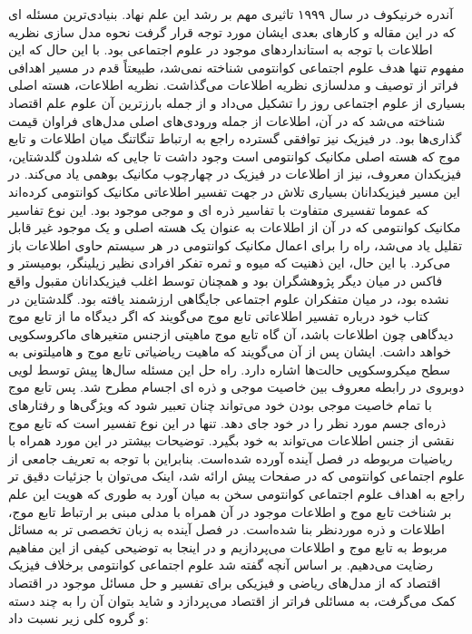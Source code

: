 \documentclass[a4paper,titlepage,12pt,fleqn,oneside]{report}
\begin{document}
	آندره خرنیکوف  در سال ۱۹۹۹ تاثیری مهم بر رشد این علم نهاد. بنیادی‌ترین مسئله ای که در این مقاله و کارهای بعدی ایشان\cite{kh3} مورد توجه قرار گرفت نحوه مدل سازی نظریه اطلاعات با توجه به استانداردهای موجود در علوم اجتماعی بود. با این حال که این مفهوم تنها هدف علوم اجتماعی کوانتومی شناخته نمی‌شد، طبیعتاً قدم در مسیر اهدافی فراتر از توصیف و مدلسازی نظریه اطلاعات می‌گذاشت. نظریه اطلاعات، هسته اصلی بسیاری از علوم اجتماعی روز را تشکیل می‌داد و از جمله بارزترین آن علوم علم اقتصاد شناخته می‌شد که در آن، اطلاعات از جمله ورودی‌های اصلی مدل‌های فراوان قیمت گذاری‌ها بود. در فیزیک نیز توافقی گسترده راجع به ارتباط تنگاتنگ میان اطلاعات و تابع موج که هسته اصلی مکانیک کوانتومی است وجود داشت تا جایی که شلدون گلدشتاین، فیزیکدان معروف، نیز  از اطلاعات در فیزیک در چهارچوب مکانیک بوهمی یاد می‌کند\cite{gold}.  در این مسیر فیزیکدانان بسیاری تلاش در جهت تفسیر اطلاعاتی مکانیک کوانتومی کرده‌اند که عموما تفسیری متفاوت با تفاسیر ذره ای و موجی موجود بود. این نوع تفاسیر مکانیک کوانتومی که در آن از اطلاعات به عنوان یک هسته اصلی و یک موجود غیر قابل تقلیل یاد می‌شد، راه را برای اعمال مکانیک کوانتومی در هر سیستم حاوی اطلاعات باز می‌کرد. با این حال، این ذهنیت که میوه و ثمره تفکر افرادی نظیر زیلینگر، بومیستر\cite{boosem} و فاکس\cite{fucks}  در میان دیگر پژوهشگران بود و همچنان توسط اغلب فیزیکدانان مقبول واقع نشده بود، در میان متفکران علوم اجتماعی جایگاهی ارزشمند یافته بود. گلدشتاین در کتاب خود درباره تفسیر اطلاعاتی تابع موج می‌گویند که اگر دیدگاه ما از تابع موج دیدگاهی چون اطلاعات باشد، آن گاه تابع موج ماهیتی ازجنس متغیرهای ماکروسکوپی خواهد داشت. ایشان پس از آن می‌گویند که ماهیت ریاضیاتی تابع موج و هامیلتونی به سطح میکروسکوپی حالت‌ها اشاره دارد. راه حل این مسئله سال‌ها پیش توسط لویی دوبروی در رابطه معروف بین خاصیت موجی و ذره ای اجسام مطرح شد. پس تابع موج با تمام خاصیت موجی بودن خود می‌تواند چنان تعبیر شود که ویژگی‌ها و رفتارهای ذره‌ای جسم مورد نظر را در خود جای دهد. تنها در این نوع تفسیر است که تابع موج نقشی از جنس اطلاعات می‌تواند به خود بگیرد. توضیحات بیشتر در این مورد همراه با ریاضیات مربوطه در فصل آینده آورده شده‌است. بنابراین با توجه به تعریف جامعی از علوم اجتماعی کوانتومی که در صفحات پیش ارائه شد، اینک می‌توان با جزئیات دقیق تر راجع به اهداف علوم اجتماعی کوانتومی سخن به میان آورد به طوری که هویت این علم بر شناخت تابع موج و اطلاعات موجود در آن همراه با مدلی مبنی بر ارتباط تابع موج، اطلاعات و ذره موردنظر بنا شده‌است. در فصل آینده به زبان تخصصی تر به مسائل مربوط به تابع موج و اطلاعات می‌پردازیم و در اینجا به توضیحی کیفی از این مفاهیم رضایت می‌دهیم. بر اساس آنچه گفته شد علوم اجتماعی کوانتومی برخلاف فیزیک اقتصاد که از مدل‌های ریاضی و فیزیکی برای تفسیر و حل مسائل موجود در اقتصاد کمک می‌گرفت، به مسائلی فراتر از اقتصاد می‌پردازد و شاید بتوان آن را به چند دسته و گروه کلی زیر نسبت داد:\\
\end{document}
